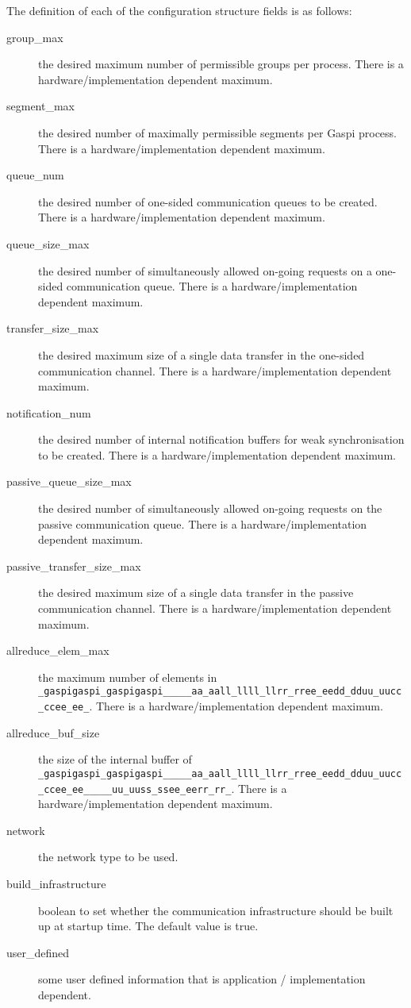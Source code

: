 \documentclass[a4paper]{article}
\makeatletter
\newlength{\st}\setlength{\st}{0pt}
\newcommand{\zerowsep}{\hskip 0pt plus 0.1pt minus 0.1pt}
\newcommand{\ZSEP}[1]{\ifx#1\@@@EOZ@@@\let\next\relax\else\ifx#1\_#1\zerowsep\else#1\fi\let\next\ZSEP\fi\next}
\newcommand{\zsep}[1]{\ZSEP{}#1\@@@EOZ@@@}
\newcommand{\gaspiprefix}{gaspi}
\newcommand{\GASPI}{{\sc Gaspi}}
\newcommand{\function}[1]{{\tt #1}}
\newcommand{\gaspifunction}[1]{\function{\protect\zsep{\gaspiprefix\_#1}}}
\makeatother
\begin{document}
The definition of each of the configuration structure fields is as follows:

\begin{description}
\item[group\_max] the desired maximum number of permissible groups per process. There is a hardware/implementation dependent maximum.
\item[segment\_max] the desired number of maximally permissible segments per \GASPI{} process.
There is a hardware/implementation dependent maximum.
\item[queue\_num] the desired number of one-sided communication queues to be created. There is a hardware/implementation
dependent maximum.
\item[queue\_size\_max] the desired number of simultaneously allowed on-going requests on a one-sided communication queue.
There is a hardware/implementation dependent maximum.
\item[transfer\_size\_max] the desired maximum size of a single data
  transfer in the one-sided communication channel.
There is a hardware/implementation dependent maximum.
\item[notification\_num] the desired number of internal notification buffers for weak synchronisation to be created.
There is a hardware/implementation dependent maximum.
\item[passive\_queue\_size\_max] the desired number of simultaneously allowed on-going requests on the
passive communication queue. There is a hardware/implementation dependent maximum.
\item[passive\_transfer\_size\_max] the desired maximum size of a
  single data transfer in the passive communication channel.
There is a hardware/implementation dependent maximum.
\item[allreduce\_elem\_max] the maximum number of elements in \gaspifunction{allreduce}.
There is a hardware/implementation dependent maximum.
\item[allreduce\_buf\_size] the size of the internal buffer of \gaspifunction{allreduce\_user}.
There is a hardware/implementation dependent maximum.
\item[network] the network type to be used.
\item[build\_infrastructure] boolean to set whether the communication infrastructure should
be built up at startup time. The default value is true.
\item[user\_defined] some user defined information that is application / implementation dependent.
\end{description}
\end{document}
